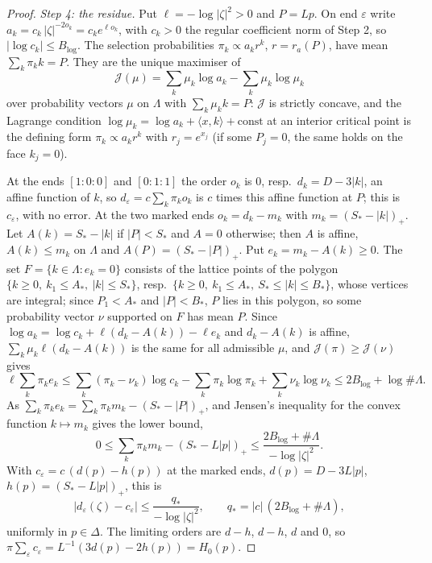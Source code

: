 \begin{proof}
\emph{Step 4: the residue.} Put $\ell=-\log|\zeta|^2>0$ and $P=Lp$. On end $\varepsilon$ write
$a_k=c_k\,|\zeta|^{-2o_k}=c_ke^{\ell o_k}$, with $c_k>0$ the regular coefficient norm of Step 2, so $|\log c_k|\le B_{\log}$.
The selection probabilities $\pi_k\propto a_kr^k$, $r=r_a(P)$, have mean $\sum_k\pi_kk=P$. They are the unique maximiser of
\[
 \mathcal J(\mu)=\sum_k\mu_k\log a_k-\sum_k\mu_k\log\mu_k
\]
over probability vectors $\mu$ on $\Lambda$ with $\sum_k\mu_kk=P$: $\mathcal J$ is strictly concave, and the Lagrange condition
$\log\mu_k=\log a_k+\langle x,k\rangle+\text{const}$ at an interior critical point is the defining form $\pi_k\propto a_kr^k$ with
$r_j=e^{x_j}$ (if some $P_j=0$, the same holds on the face $k_j=0$).

At the ends $[1{:}0{:}0]$ and $[0{:}1{:}1]$ the order $o_k$ is $0$, resp.\ $d_k=D-3|k|$, an affine function of $k$, so
$d_\varepsilon=c\sum_k\pi_ko_k$ is $c$ times this affine function at $P$; this is $c_\varepsilon$, with no error. At the two
marked ends $o_k=d_k-m_k$ with $m_k=(S_*-|k|)_+$. Let $A(k)=S_*-|k|$ if $|P|<S_*$ and $A=0$ otherwise; then $A$ is affine,
$A(k)\le m_k$ on $\Lambda$ and $A(P)=(S_*-|P|)_+$. Put $e_k=m_k-A(k)\ge0$. The set $F=\{k\in\Lambda:e_k=0\}$ consists of the
lattice points of the polygon $\{k\ge0,\ k_1\le A_*,\ |k|\le S_*\}$, resp.\ $\{k\ge0,\ k_1\le A_*,\ S_*\le|k|\le B_*\}$, whose
vertices are integral; since $P_1<A_*$ and $|P|<B_*$, $P$ lies in this polygon, so some probability vector $\nu$ supported on
$F$ has mean $P$. Since $\log a_k=\log c_k+\ell(d_k-A(k))-\ell e_k$ and $d_k-A(k)$ is affine, $\sum_k\mu_k\ell(d_k-A(k))$ is the same
for all admissible $\mu$, and $\mathcal J(\pi)\ge\mathcal J(\nu)$ gives
\[
 \ell\sum_k\pi_ke_k\le\sum_k(\pi_k-\nu_k)\log c_k-\sum_k\pi_k\log\pi_k+\sum_k\nu_k\log\nu_k\le2B_{\log}+\log\#\Lambda .
\]
As $\sum_k\pi_ke_k=\sum_k\pi_km_k-(S_*-|P|)_+$, and Jensen's inequality for the convex function $k\mapsto m_k$ gives the lower bound,
\[
 0\le\sum_k\pi_km_k-(S_*-L|p|)_+\le\frac{2B_{\log}+\#\Lambda}{-\log|\zeta|^2}.
\]
With $c_\varepsilon=c\,(d(p)-h(p))$ at the marked ends, $d(p)=D-3L|p|$, $h(p)=(S_*-L|p|)_+$, this is
\[
 |d_\varepsilon(\zeta)-c_\varepsilon|\le\frac{q_*}{-\log|\zeta|^2},\qquad q_*=|c|\,(2B_{\log}+\#\Lambda),
\]
uniformly in $p\in\Delta$. The limiting orders are $d-h$, $d-h$, $d$ and $0$, so
$\pi\sum_\varepsilon c_\varepsilon=L^{-1}(3d(p)-2h(p))=H_0(p)$.


\end{proof}
